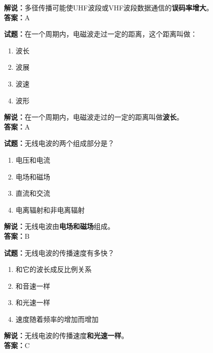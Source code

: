 \documentclass{ctexbook}
\begin{document}
\noindent\textbf{解说：}多径传播可能使UHF波段或VHF波段数据通信的\textbf{误码率增大}。\\\noindent\textbf{答案：}A

\vspace{\baselineskip}

\noindent\textbf{试题：}在一个周期内，电磁波走过一定的距离，这个距离叫做：

\begin{enumerate}[leftmargin=3em]
  \item 波长
  \item 波展
  \item 波速
  \item 波形
\end{enumerate}

\noindent\textbf{解说：}在一个周期内，电磁波走过的一定的距离叫做\textbf{波长}。\\\noindent\textbf{答案：}A

\vspace{\baselineskip}

\noindent\textbf{试题：}无线电波的两个组成部分是？

\begin{enumerate}[leftmargin=3em]
  \item 电压和电流
  \item 电场和磁场
  \item 直流和交流
  \item 电离辐射和非电离辐射
\end{enumerate}

\noindent\textbf{解说：}无线电波由\textbf{电场和磁场}组成。\\\noindent\textbf{答案：}B

\vspace{\baselineskip}

\noindent\textbf{试题：}无线电波的传播速度有多快？

\begin{enumerate}[leftmargin=3em]
  \item 和它的波长成反比例关系
  \item 和音速一样
  \item 和光速一样
  \item 速度随着频率的增加而增加
\end{enumerate}

\noindent\textbf{解说：}无线电波的传播速度\textbf{和光速一样}。\\\noindent\textbf{答案：}C

\vspace{\baselineskip}
\end{document}
